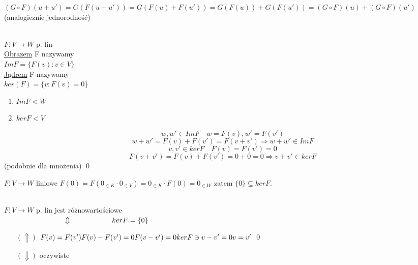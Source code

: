 \begin{dd}
    $(G \circ F)(u+u') = G(F(u+u')) = G(F(u) + F(u')) = G(F(u)) + G(F(u')) = (G \circ F)(u) + (G \circ F)(u') $ (analogicznie jednorodność)
\end{dd}

\begin{df} ~\\
    $F: V \rightarrow W $ p. lin \\
    \underline{Obrazem} F nazywamy \\
    $Im F = \{ F(v): v \in V\}$ \\
    \underline{Jądrem} F nazywamy \\
    $ker(F) = \{v: F(v) = 0\}$
\end{df} 
\begin{ft} \hfill 
    \begin{enumerate}[{(}1{)}]
        \item $Im F < W$
        \item $kerF < V$
    \end{enumerate}
\end{ft}

\begin{dd} 
    $$w,w' \in Im F \quad w=F(v), w'=F(v')$$ 
    $$w+w' = F(v) + F(v') = F(v+v') \Rightarrow w+w' \in ImF $$
    \vspace{5mm}
    $$v,v' \in ker F \quad F(v) = F(v') = 0$$
    $$F(v+v') = F(v) + F(v') = 0 + 0 = 0 \Rightarrow v+v' \in ker F$$ 
    \hfill (podobnie dla mnożenia) \qed
\end{dd}

\begin{uw}
    $F: V \rightarrow W $ liniowe
    $F(0) = F(0_{\in K}\cdot 0_{\in V}) = 0_{\in K} \cdot F(0) = 0_{\in W}$ %
    zatem $\{0\} \subseteq ker F$.
\end{uw}

\begin{ft} 
    ~\\
    $F: V \rightarrow W $ p. lin jest różnowartościowe \\
    $ \hspace*{30mm} \Updownarrow \\
        \hspace*{20mm} ker F = \{ 0 \}
    $
\end{ft}

\begin{dd} \hfill
    \begin{itemize}
        \item[$(\Uparrow)$] $F(v) = F(v') \\ 
            F(v)-F(v') = 0 \\
            F(v-v') = 0 \\
            ker F \ni v-v' = 0 \\
            v = v' 
        $ \qed
        \item[$(\Downarrow)$] oczywiste
    \end{itemize}
\end{dd}

